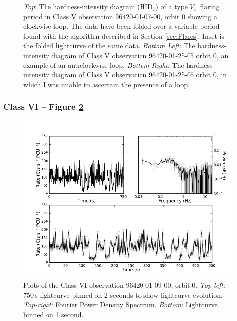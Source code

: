 \begin{figure}
    \captionsetup{singlelinecheck=off}
    \caption[The hardness-intensity diagram of a type $V_1$ flaring period in Class V observation 96420-01-07-00 showing a clockwise loop.]{\textit{Top}: The hardness-intensity diagram (HID$_1$) of a type $V_1$\indexv\ flaring period in Class V observation 96420-01-07-00, orbit 0 showing a clockwise loop.  The data have been folded over a variable period found with the algorithm described in Section \ref{sec:Flares}.  Inset is the folded lightcurve of the same data. \textit{Bottom Left}: The hardness-intensity diagram of Class V observation 96420-01-25-05 orbit 0, an example of an anticlockwise loop.  \textit{Bottom Right}: The hardness-intensity diagram of Class V observation 96420-01-25-06 orbit 0, in which I was unable to ascertain the presence of a loop.}
   \label{fig:LoopV}
\end{figure}

\subsubsection{Class VI -- Figure \ref{fig:Lmulti}}

\begin{figure}
    \includegraphics[width=0.8\columnwidth, trim = 0.6cm 0 3.9cm 0]{images/Lmulti.png}
    \captionsetup{singlelinecheck=off}
    \caption[Characteristic lightcurves and a power spectrum of Type VI variability.]{Plots of the Class VI observation 96420-01-09-00, orbit 0.  \textit{Top-left}: 750\,s lightcurve binned on 2 seconds to show lightcurve evolution.  \textit{Top-right}: Fourier Power Density Spectrum.  \textit{Bottom}: Lightcurve binned on 1 second.}
   \label{fig:Lmulti}
\end{figure}

